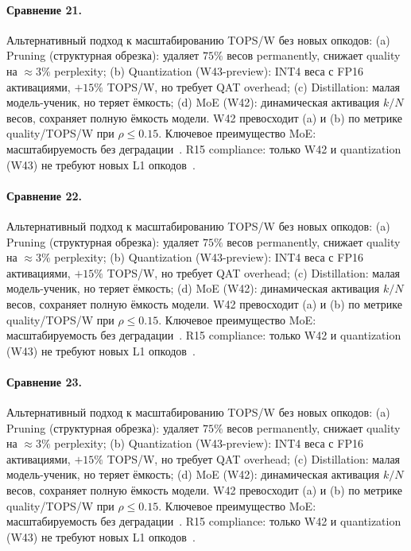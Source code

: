 \paragraph{Сравнение 21.} Альтернативный подход к масштабированию TOPS/W без новых опкодов: (a) Pruning (структурная обрезка): удаляет $75\%$ весов permanently, снижает quality на $\approx 3\%$ perplexity; (b) Quantization (W43-preview): INT4 веса с FP16 активациями, $+15\%$ TOPS/W, но требует QAT overhead; (c) Distillation: малая модель-ученик, но теряет ёмкость; (d) MoE (W42): динамическая активация $k/N$ весов, сохраняет полную ёмкость модели. W42 превосходит (a) и (b) по метрике quality/TOPS/W при $\rho \leq 0{.}15$. Ключевое преимущество MoE: масштабируемость без деградации~\cite{switch_transformer2021,mixtral2024}. R15 compliance: только W42 и quantization (W43) не требуют новых L1 опкодов~\cite{lee_gvsu_proof2021}.

\paragraph{Сравнение 22.} Альтернативный подход к масштабированию TOPS/W без новых опкодов: (a) Pruning (структурная обрезка): удаляет $75\%$ весов permanently, снижает quality на $\approx 3\%$ perplexity; (b) Quantization (W43-preview): INT4 веса с FP16 активациями, $+15\%$ TOPS/W, но требует QAT overhead; (c) Distillation: малая модель-ученик, но теряет ёмкость; (d) MoE (W42): динамическая активация $k/N$ весов, сохраняет полную ёмкость модели. W42 превосходит (a) и (b) по метрике quality/TOPS/W при $\rho \leq 0{.}15$. Ключевое преимущество MoE: масштабируемость без деградации~\cite{switch_transformer2021,mixtral2024}. R15 compliance: только W42 и quantization (W43) не требуют новых L1 опкодов~\cite{lee_gvsu_proof2021}.

\paragraph{Сравнение 23.} Альтернативный подход к масштабированию TOPS/W без новых опкодов: (a) Pruning (структурная обрезка): удаляет $75\%$ весов permanently, снижает quality на $\approx 3\%$ perplexity; (b) Quantization (W43-preview): INT4 веса с FP16 активациями, $+15\%$ TOPS/W, но требует QAT overhead; (c) Distillation: малая модель-ученик, но теряет ёмкость; (d) MoE (W42): динамическая активация $k/N$ весов, сохраняет полную ёмкость модели. W42 превосходит (a) и (b) по метрике quality/TOPS/W при $\rho \leq 0{.}15$. Ключевое преимущество MoE: масштабируемость без деградации~\cite{switch_transformer2021,mixtral2024}. R15 compliance: только W42 и quantization (W43) не требуют новых L1 опкодов~\cite{lee_gvsu_proof2021}.

